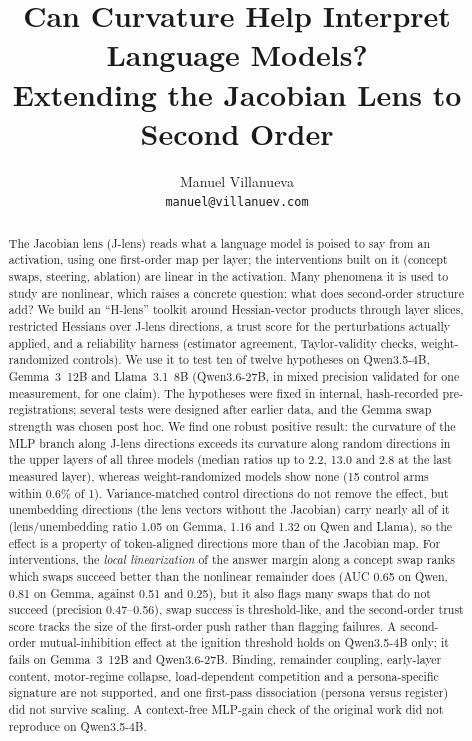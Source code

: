 \documentclass[10pt]{article}
\title{\vspace{-1.2em}Can Curvature Help Interpret Language Models?\\Extending the Jacobian Lens to Second Order}
\author{Manuel Villanueva\\\texttt{manuel@villanuev.com}}
\date{}
\begin{document}
\maketitle
\vspace{-2.2em}
\begin{abstract}
\small
The Jacobian lens (J-lens) reads what a language model is poised to say from an activation, using one first-order map per layer; the interventions built on it (concept swaps, steering, ablation) are linear in the activation. Many phenomena it is used to study are nonlinear, which raises a concrete question: what does second-order structure add? We build an ``H-lens'' toolkit around Hessian-vector products through layer slices, restricted Hessians over J-lens directions, a trust score for the perturbations actually applied, and a reliability harness (estimator agreement, Taylor-validity checks, weight-randomized controls). We use it to test ten of twelve hypotheses on Qwen3.5-4B, Gemma~3~12B and Llama~3.1~8B (Qwen3.6-27B, in mixed precision validated for one measurement, for one claim). The hypotheses were fixed in internal, hash-recorded pre-registrations; several tests were designed after earlier data, and the Gemma swap strength was chosen post hoc.
We find one robust positive result: the curvature of the MLP branch along J-lens directions exceeds its curvature along random directions in the upper layers of all three models (median ratios up to 2.2, 13.0 and 2.8 at the last measured layer), whereas weight-randomized models show none (15 control arms within 0.6\% of 1). Variance-matched control directions do not remove the effect, but unembedding directions (the lens vectors without the Jacobian) carry nearly all of it (lens/unembedding ratio 1.05 on Gemma, 1.16 and 1.32 on Qwen and Llama), so the effect is a property of token-aligned directions more than of the Jacobian map.
For interventions, the \emph{local linearization} of the answer margin along a concept swap ranks which swaps succeed better than the nonlinear remainder does (AUC 0.65 on Qwen, 0.81 on Gemma, against 0.51 and 0.25), but it also flags many swaps that do not succeed (precision 0.47--0.56), swap success is threshold-like, and the second-order trust score tracks the size of the first-order push rather than flagging failures.
A second-order mutual-inhibition effect at the ignition threshold holds on Qwen3.5-4B only; it fails on Gemma~3~12B and Qwen3.6-27B. Binding, remainder coupling, early-layer content, motor-regime collapse, load-dependent competition and a persona-specific signature are not supported, and one first-pass dissociation (persona versus register) did not survive scaling. A context-free MLP-gain check of the original work did not reproduce on Qwen3.5-4B.
\end{abstract}
\end{document}
